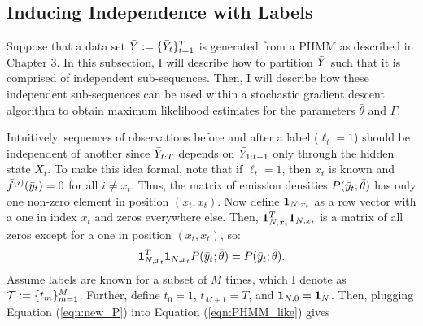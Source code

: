 
\subsection{Inducing Independence with Labels}

\label{ss:indep_w_labels}

Suppose that a data set $\bar{Y} := \{\bar{Y}_t\}_{t=1}^T$ is generated from a PHMM as described in Chapter 3. In this subsection, I will describe how to partition $\bar{Y}$ such that it is comprised of independent sub-sequences. Then, I will describe how these independent sub-sequences can be used within a stochastic gradient descent algorithm to obtain maximum likelihood estimates for the parameters $\bar \theta$ and $\Gamma$. %

Intuitively, sequences of observations before and after a label ($\ell_t = 1$) should be independent of another since $\bar{Y}_{t:T}$ depends on $\bar{Y}_{1:t-1}$ only through the hidden state $X_t$. To make this idea formal, note that if $\ell_t = 1$, then $x_t$ is known and $\bar{f}^{(i)}(\bar{y}_t) = 0$ for all $i \neq x_t$. Thus, the matrix of emission densities $P(\bar{y}_t;\bar{\theta})$ has only one non-zero element in position $(x_t,x_t)$. Now define $\mathbf{1}_{N,x_t}$ as a row vector with a one in index $x_t$ and zeros everywhere else. Then, $\mathbf{1}^T_{N,x_t} \mathbf{1}_{N,x_t}$ is a matrix of all zeros except for a one in position $(x_t,x_t)$, so:
%
\begin{equation}
    \mathbf{1}^T_{N,x_t} \mathbf{1}_{N,x_t} P(\bar{y}_t;\bar{\theta}) = P(\bar{y}_t;\bar{\theta}).
    \label{eqn:new_P}
\end{equation}
%
Assume labels are known for a subset of $M$ times, which I denote as $\mathcal{T} := \{t_m\}_{m=1}^M$. Further, define $t_0 = 1$, $t_{M+1}=T$, and $\mathbf{1}_{N,0} = \mathbf{1}_N$. Then, plugging Equation (\ref{eqn:new_P}) into Equation (\ref{eqn:PHMM_like}) gives

